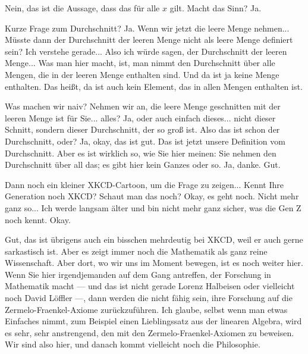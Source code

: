 \begin{spoken-clean}[continued]
Nein, das ist die Aussage, dass das für alle $x$ gilt. Macht das Sinn? Ja.
\end{spoken-clean}

\begin{spoken-clean}[00:39:35 - 00:40:53]
Kurze Frage zum Durchschnitt? Ja. Wenn wir jetzt die leere Menge nehmen... Müsste dann der Durchschnitt der leeren Menge nicht als leere Menge definiert sein? Ich verstehe gerade... Also ich würde sagen, der Durchschnitt der leeren Menge... Was man hier macht, ist, man nimmt den Durchschnitt über alle Mengen, die in der leeren Menge enthalten sind. Und da ist ja keine Menge enthalten. Das heißt, da ist auch kein Element, das in allen Mengen enthalten ist.

Was machen wir naiv? Nehmen wir an, die leere Menge geschnitten mit der leeren Menge ist für Sie... alles? Ja, oder auch einfach dieses... nicht dieser Schnitt, sondern dieser Durchschnitt, der so groß ist. Also das ist schon der Durchschnitt, oder? Ja, okay, das ist gut. Das ist jetzt unsere Definition vom Durchschnitt. Aber es ist wirklich so, wie Sie hier meinen: Sie nehmen den Durchschnitt über all das; es gibt hier kein Ganzes oder so. Ja, danke. Gut.
\end{spoken-clean}

\begin{spoken-clean}[00:40:53 - 00:41:07]
Dann noch ein kleiner XKCD-Cartoon, um die Frage zu zeigen... Kennt Ihre Generation noch XKCD? Schaut man das noch? Okay, es geht noch. Nicht mehr ganz so... Ich werde langsam älter und bin nicht mehr ganz sicher, was die Gen Z noch kennt. Okay.

Gut, das ist übrigens auch ein bisschen mehrdeutig bei XKCD, weil er auch gerne sarkastisch ist. Aber es zeigt immer noch die Mathematik als ganz reine Wissenschaft. Aber dort, wo wir uns im Moment bewegen, ist es noch weiter hier. Wenn Sie hier irgendjemanden auf dem Gang antreffen, der Forschung in Mathematik macht --- und das ist nicht gerade Lorenz Halbeisen oder vielleicht noch David Löffler ---, dann werden die nicht fähig sein, ihre Forschung auf die Zermelo-Fraenkel-Axiome zurückzuführen. Ich glaube, selbst wenn man etwas Einfaches nimmt, zum Beispiel einen Lieblingssatz aus der linearen Algebra, wird es sehr, sehr anstrengend, den mit den Zermelo-Fraenkel-Axiomen zu beweisen. Wir sind also hier, und danach kommt vielleicht noch die Philosophie.
\end{spoken-clean}


